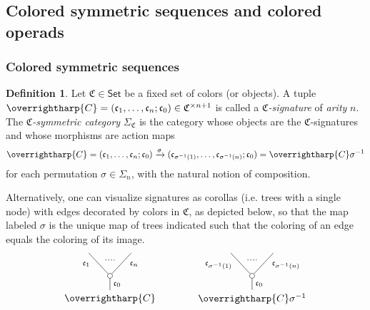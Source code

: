 \documentclass[a4paper,10pt
 ,final
]{article}%
\numberwithin{equation}{section}
\numberwithin{figure}{section}
\theoremstyle{definition} %
\newtheorem{definition}[equation]{Definition}%
\newcommand{\vect}[1]{\text{\overrightharp{\ensuremath{#1}}}}
\newcommand{\1}{\ensuremath{\mathbbm 1}}%
\begin{document}
\subsection{Colored symmetric sequences and colored operads}
\label{COSYMSEQ SEC}


\subsubsection*{Colored symmetric sequences}




\begin{definition}\label{CSYM DEF}
	Let $\mathfrak {C} \in \mathsf{Set}$ be a fixed set of colors (or objects).
	A tuple
	$\vect C = (\mathfrak c_1, \dots, \mathfrak c_n; \mathfrak c_0) \in \mathfrak{C}^{\times n+1}$
	is called a \textit{$\mathfrak {C}$-signature} of \textit{arity} $n$.
	The \textit{$\mathfrak C$-symmetric category} $\Sigma_{\mathfrak C}$ is the category whose objects are the $\mathfrak{C}$-signatures and 
	whose morphisms are action maps
	\begin{equation}\label{CSYM EQ1}
	\vect{C} =
	(\mathfrak c_1, \dots, \mathfrak c_n; \mathfrak c_0) \xrightarrow{\sigma} (\mathfrak c_{\sigma^{-1}(1)}, \dots, \mathfrak c_{\sigma^{-1}(n)}; \mathfrak c_0)
	= \vect{C} \sigma^{-1}
	\end{equation}
	for each permutation $\sigma \in \Sigma_n$, with the natural notion of composition.
	
	Alternatively, one can visualize signatures as corollas (i.e. trees with a single node)
	with edges decorated by colors in $\mathfrak{C}$, as depicted below, so that the map labeled $\sigma$
	is the unique map of trees indicated such that the coloring of an edge equals the coloring of its image.
	\begin{equation}\label{CSYM EQ2}
	\begin{tikzpicture}
	[grow=up,auto,level distance=2.3em,every node/.style = {font=\footnotesize},dummy/.style={circle,draw,inner sep=0pt,minimum size=1.75mm}]
	
	\node at (0,0) [font=\normalsize]{$\vect{C}$}
	child{node [dummy] {}
		child{
			edge from parent node [swap,near end] {$\mathfrak c_n$} node [name=Kn] {}}
		child{
			edge from parent node [near end] {$\mathfrak c_1$}
			node [name=Kone,swap] {}}
		edge from parent node [swap] {$\mathfrak c_0$}
	};
	\draw [dotted,thick] (Kone) -- (Kn) ;
	\node at (5,0) [font=\normalsize] {$\vect{C} \sigma^{-1}
		$}
	child{node [dummy] {}
		child{
			edge from parent node [swap,near end] {$\mathfrak c_{\sigma^{-1}(n)}$} node [name=Kn] {}}
		child{
			edge from parent node [near end] {$\mathfrak c_{\sigma^{-1}(1)}$}
			node [name=Kone,swap] {}}
		edge from parent node [swap] {$\mathfrak c_0$}
	};
	\draw [dotted,thick] (Kone) -- (Kn) ;
	

\end{tikzpicture}
\end{equation}
\end{definition}
\end{document}
